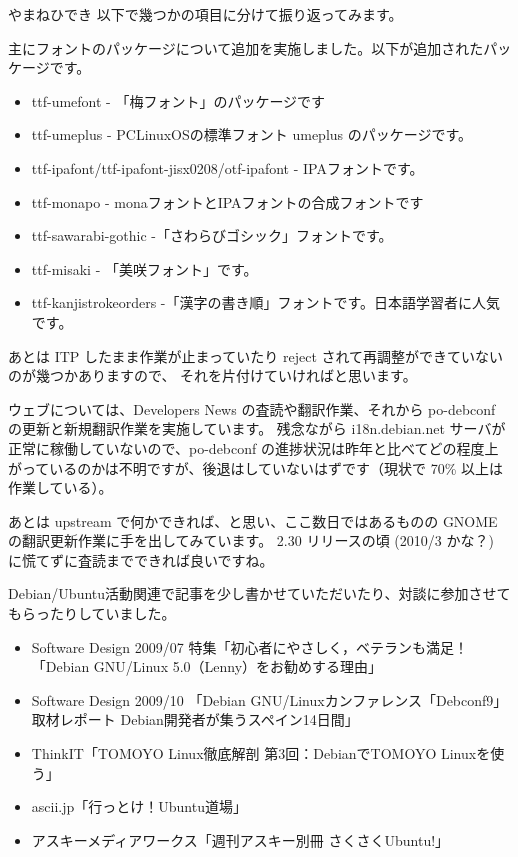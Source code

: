 \begin{prework}{やまねひでき}
以下で幾つかの項目に分けて振り返ってみます。

主にフォントのパッケージについて追加を実施しました。以下が追加されたパッケージです。

\begin{itemize}
 \item ttf-umefont - 「梅フォント」のパッケージです
 \item ttf-umeplus - PCLinuxOSの標準フォント umeplus のパッケージです。
 \item ttf-ipafont/ttf-ipafont-jisx0208/otf-ipafont - IPAフォントです。
 \item ttf-monapo - monaフォントとIPAフォントの合成フォントです
 \item ttf-sawarabi-gothic -「さわらびゴシック」フォントです。
 \item ttf-misaki - 「美咲フォント」です。
 \item ttf-kanjistrokeorders -「漢字の書き順」フォントです。日本語学習者に人気です。
\end{itemize}

あとは ITP したまま作業が止まっていたり reject されて再調整ができていないのが幾つかありますので、
それを片付けていければと思います。

ウェブについては、Developers News の査読や翻訳作業、それから po-debconf の更新と新規翻訳作業を実施しています。
残念ながら i18n.debian.net サーバが正常に稼働していないので、po-debconf の進捗状況は昨年と比べてどの程度上がっているのかは不明ですが、後退はしていないはずです（現状で 70\% 以上は作業している）。

あとは upstream で何かできれば、と思い、ここ数日ではあるものの GNOME の翻訳更新作業に手を出してみています。
2.30 リリースの頃 (2010/3 かな？) に慌てずに査読までできれば良いですね。

Debian/Ubuntu活動関連で記事を少し書かせていただいたり、対談に参加させてもらったりしていました。

\begin{itemize}
 \item Software Design 2009/07 特集「初心者にやさしく，ベテランも満足！「Debian GNU/Linux 5.0（Lenny）をお勧めする理由」
 \item Software Design 2009/10 「Debian GNU/Linuxカンファレンス「Debconf9」取材レポート Debian開発者が集うスペイン14日間」
 \item ThinkIT「TOMOYO Linux徹底解剖 第3回：DebianでTOMOYO Linuxを使う」
 \item ascii.jp「行っとけ！Ubuntu道場」
 \item アスキーメディアワークス「週刊アスキー別冊 さくさくUbuntu!」
\end{itemize}


\end{prework}
